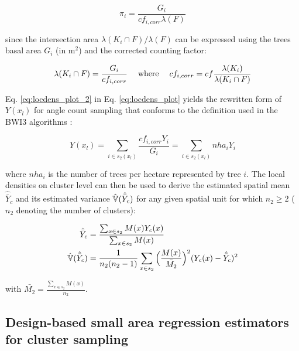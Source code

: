 \begin{equation}\label{eq:locdens_plot_2}
\pi_{i} = \frac{G_i}{cf_{i,corr}\lambda(F)}
	\end{equation}

\noindent since the intersection area $\lambda(K_i \cap F)/\lambda(F)$ can be expressed using the trees basal area $G_i$ (in m$^2$) and the corrected counting factor:

\begin{equation}\label{eq:locdens_plot_3}
\lambda(K_i \cap F) = \frac{G_i}{cf_{i, corr}} \hspace{3ex} \text{where} \hspace{3ex} cf_{i,corr} = cf\frac{\lambda(K_i)}{\lambda(K_i \cap F)}
\end{equation}

Eq. \ref{eq:locdens_plot_2} in Eq. \ref{eq:locdens_plot} yields the rewritten form of $Y(x_l)$ for angle count sampling that conforms to the definition used in the BWI3 algorithms \citep{bwi3_ausw}:

\begin{equation}\label{eq:locdens_plot_4}
Y(x_l)= \sum_{i \in s_{2}(x_l)} \frac{cf_{i, corr}Y_i}{G_i} = \sum_{i \in s_{2}(x_l)} nha_{i}{Y_i}
\end{equation}

\noindent where $nha_i$ is the number of trees per hectare represented by tree $i$. The local densities on cluster level can then be used to derive the estimated spatial mean $\hat{\bar{Y}}_c$ and its estimated variance $\hat{\mathbb{V}}(\hat{\bar{Y}}_c)$ for any given spatial unit for which $n_2 \geq 2$ ($n_2$ denoting the number of clusters):

\begin{subequations}\label{eq:srs_est_clusters}
	\begin{align}
\hat{\bar{Y}}_c &= \frac{\sum_{x \in s_2} M(x) Y_{c}(x)}{\sum_{x \in s_2} M(x)} \\
\hat{\mathbb{V}}(\hat{\bar{Y}}_c) &= \frac{1}{n_2(n_2 - 1)}\sum_{x \in s_2}\Big(\frac{M(x)}{\bar{M_2}}\Big)^2(Y_{c}(x) - \hat{\bar{Y}}_c)^2
	\end{align}
\end{subequations}

with $\bar{M_2}=\frac{\sum_{x \in s_{2}}M(x)}{n_{2}}$.


\subsection{Design-based small area regression estimators for cluster sampling}
\label{sec:SAestimators}

